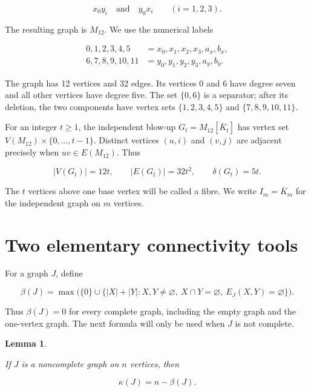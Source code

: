 \documentclass[11pt]{article}
\newtheorem{lemma}[theorem]{Lemma}
\begin{document}
\nopagebreak[4]
\[
x_0y_i\quad\text{and}\quad y_0x_i
\qquad (i=1,2,3).                                            \tag{7}
\]

The resulting graph is $M_{12}$. We use the numerical labels

\nopagebreak[4]
\[
\begin{aligned}
0,1,2,3,4,5&=x_0,x_1,x_2,x_3,a_x,b_x,\\
6,7,8,9,10,11&=y_0,y_1,y_2,y_3,a_y,b_y.
\end{aligned}                                                \tag{8}
\]

The graph has 12 vertices and 32 edges. Its vertices $0$ and $6$ have degree
seven and all other vertices have degree five. The set $\{0,6\}$ is a separator;
after its deletion, the two components have vertex sets $\{1,2,3,4,5\}$ and
$\{7,8,9,10,11\}$.

For an integer $t\geq1$, the independent blow-up
$G_t=M_{12}[\overline K_t]$ has vertex set
$V(M_{12})\times\{0,\ldots,t-1\}$. Distinct vertices $(u,i)$ and $(v,j)$ are
adjacent precisely when $uv\in E(M_{12})$. Thus

\nopagebreak[4]
\[
|V(G_t)|=12t,
\qquad
|E(G_t)|=32t^2,
\qquad
\delta(G_t)=5t.                                              \tag{9}
\]

The $t$ vertices above one base vertex will be called a fibre. We write
$I_m=\overline K_m$ for the independent graph on $m$ vertices.

\section{Two elementary connectivity tools}


For a graph $J$, define

\nopagebreak[4]
\[
\beta(J)=\max\bigl(\{0\}\cup\{|X|+|Y|:
X,Y\ne\varnothing,\ X\cap Y=\varnothing,\ E_J(X,Y)=\varnothing\}\bigr).
                                                                    \tag{10}
\]

Thus $\beta(J)=0$ for every complete graph, including the empty graph and the
one-vertex graph. The next formula will only be used when $J$ is not complete.

\begin{lemma}
\label{lem:beta}

If $J$ is a noncomplete graph on $n$ vertices, then

\nopagebreak[4]
\[
\kappa(J)=n-\beta(J).                                       \tag{11}
\]

\end{lemma}
\end{document}

